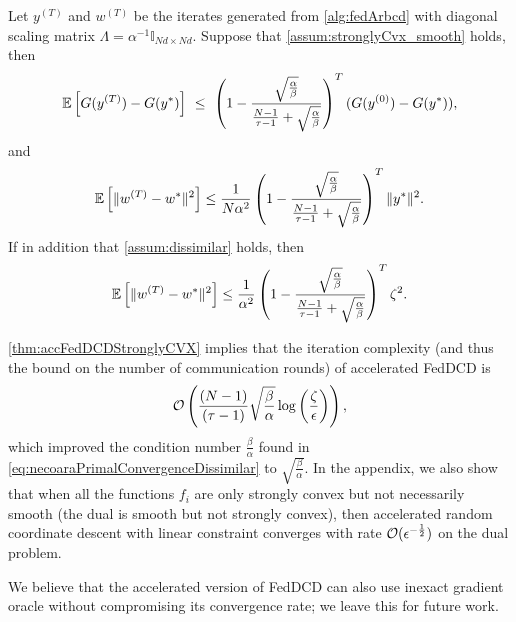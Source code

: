 \begin{theorem} \label{thm:accFedDCDStronglyCVX}
    Let $y^{(T)}$ and $w^{(T)}$ be the iterates generated from \autoref{alg:fedArbcd} with diagonal scaling matrix $\Lambda = \alpha^{-1} \mathbb{I}_{Nd \times Nd}$. Suppose that \autoref{assum:stronglyCvx_smooth} holds, then
   \begin{equation} \label{eq:necoaraDualConvergenceStrongCVXAcc}
       \mathbb{E} \left[ G( y^{(T)} ) - G( y^* ) \right] ~\leq~ \left( 1 - \frac{ \sqrt{\frac{\alpha}{\beta}} }{ \frac{N-1}{\tau -1}+ \sqrt{\frac{\alpha}{\beta}} } \right)^{T} ( G(y^{(0)}) - G(y^*) ),
   \end{equation}
   and
   \begin{equation} \label{eq:necoaraPrimalConvergenceStrongCVXAcc}
       \mathbb{E} \left[ \| w^{(T)} - w^* \|^2 \right] 
       \leq \frac{1}{N\alpha^2} \left( 1 - \frac{ \sqrt{\frac{\alpha}{\beta}} }{ \frac{N-1}{\tau -1}+ \sqrt{\frac{\alpha}{\beta}} } \right)^{T} \|y^*\|^2.
   \end{equation}
   If in addition that \autoref{assum:dissimilar} holds, then
   \begin{equation} \label{eq:necoaraPrimalConvergenceDissimilarAcc}
       \mathbb{E} \left[ \| w^{(T)} - w^* \|^2 \right] 
       \leq \frac{1}{\alpha^2} \left( 1 - \frac{ \sqrt{\frac{\alpha}{\beta}} }{ \frac{N-1}{\tau -1}+ \sqrt{\frac{\alpha}{\beta}} } \right)^{T} \zeta^2. 
   \end{equation}
\end{theorem}

\autoref{thm:accFedDCDStronglyCVX} implies that the iteration complexity (and thus the bound on the number of communication rounds) of accelerated FedDCD is 
\begin{equation}
        \mathcal{O}\left( \frac{(N-1) }{(\tau-1) } \sqrt{ \frac{\beta}{\alpha} } \log\left( \frac{ \zeta}{ \epsilon } \right) \right) , \label{eq:accFedDCDcomplexity}
\end{equation}
which improved the condition number $\frac{\beta}{\alpha}$ found in \eqref{eq:necoaraPrimalConvergenceDissimilar} to $\sqrt{\frac{\beta}{\alpha}}$. In the appendix, we also show that when all the functions $f_i$ are only strongly convex but not necessarily smooth (the dual is smooth but not strongly convex), then accelerated random coordinate descent with linear constraint converges with rate $\mathcal{O}( \epsilon^{-\frac{1}{2}} )$ on the dual problem.

We believe that the accelerated version of FedDCD can also use inexact gradient oracle without compromising its convergence rate; we leave this for future work.


